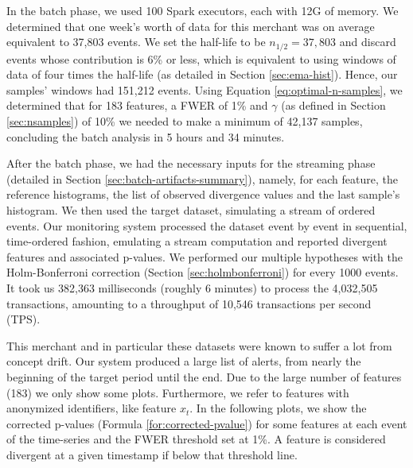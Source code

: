 In the batch phase, we used 100 Spark executors, each with 12G of memory. We determined that one week's worth of data for this merchant was on average equivalent to 37,803 events. We set the half-life to be $n_{1/2}=37,803$ and discard events whose contribution is 6\% or less, which is equivalent to using windows of data of four times the half-life (as detailed in Section \ref{sec:ema-hist}). Hence, our samples' windows had 151,212 events. Using Equation \ref{eq:optimal-n-samples}, we determined that for 183 features, a FWER of 1\% and $\gamma$ (as defined in Section \ref{sec:nsamples}) of 10\% we needed to make a minimum of 42,137 samples, concluding the batch analysis in 5 hours and 34 minutes.

After the batch phase, we had the necessary inputs for the streaming phase (detailed in Section \ref{sec:batch-artifacts-summary}), namely, for each feature, the reference histograms, the list of observed divergence values and the last sample's histogram. We then used the target dataset, simulating a stream of ordered events. Our monitoring system processed the dataset event by event in sequential, time-ordered fashion, emulating a stream computation and reported divergent features and associated p-values. We performed our multiple hypotheses with the Holm-Bonferroni correction (Section \ref{sec:holmbonferroni}) for every 1000 events. It took us 382,363 milliseconds (roughly 6 minutes) to process the 4,032,505 transactions, amounting to a throughput of 10,546 transactions per second (TPS).


This merchant and in particular these datasets were known to suffer a lot from concept drift. Our system produced a large list of alerts, from nearly the beginning of the target period until the end. Due to the large number of features (183) we only show some plots. Furthermore, we refer to features with anonymized identifiers, like feature $x_t$. In the following plots, we show the corrected p-values (Formula \ref{for:corrected-pvalue}) for some features at each event of the time-series and the FWER threshold set at 1\%. A feature is considered divergent at a given timestamp if below that threshold line.




